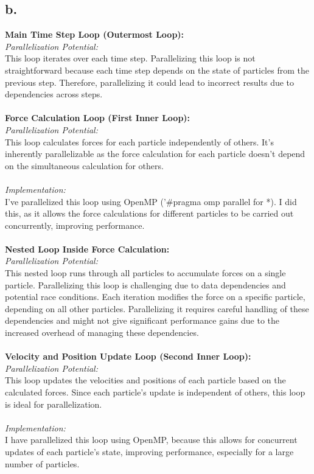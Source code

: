 \documentclass{article}
\begin{document}
\subsection*{b.}
\textbf{Main Time Step Loop (Outermost Loop):}
\\
\textit{Parallelization Potential:}
\\
This loop iterates over each time step. Parallelizing this loop is not straightforward because each time step depends on the state of particles from the previous step. Therefore, parallelizing it could lead to incorrect results due to dependencies across steps.
\\
\\
\textbf{Force Calculation Loop (First Inner Loop):}
\\
\textit{Parallelization Potential: }
\\
This loop calculates forces for each particle independently of others. It's inherently parallelizable as the force calculation for each particle doesn't depend on the simultaneous calculation for others.
\\
\\
\textit{Implementation:}
\\
I've parallelized this loop using OpenMP ('\#pragma omp parallel for *). I did this, as it allows the force calculations for different particles to be carried out concurrently, improving performance.
\\
\\
\textbf{Nested Loop Inside Force Calculation:}
\\
\textit{Parallelization Potential:} 
\\
This nested loop runs through all particles to accumulate forces on a single particle. Parallelizing this loop is challenging due to data dependencies and potential race conditions. Each iteration modifies the force on a specific particle, depending on all other particles. Parallelizing it requires careful handling of these dependencies and might not give significant performance gains due to the increased overhead of managing these dependencies.
\\
\\
\textbf{Velocity and Position Update Loop (Second Inner Loop):}
\\
\textit{Parallelization Potential: }
\\
This loop updates the velocities and positions of each particle based on the calculated forces. Since each particle's update is independent of others, this loop is ideal for parallelization.
\\
\\
\textit{Implementation:} 
\\
I have parallelized this loop using OpenMP, because this allows for concurrent updates of each particle's state, improving performance, especially for a large number of particles.
\end{document}
